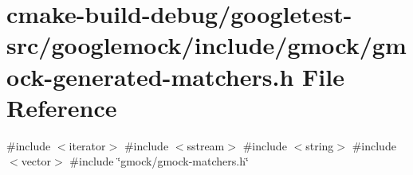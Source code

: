 \hypertarget{gmock-generated-matchers_8h}{}\section{cmake-\/build-\/debug/googletest-\/src/googlemock/include/gmock/gmock-\/generated-\/matchers.h File Reference}
\label{gmock-generated-matchers_8h}
{\ttfamily \#include $<$iterator$>$}\newline
{\ttfamily \#include $<$sstream$>$}\newline
{\ttfamily \#include $<$string$>$}\newline
{\ttfamily \#include $<$vector$>$}\newline
{\ttfamily \#include \char`\"{}gmock/gmock-\/matchers.\+h\char`\"{}}\newline

